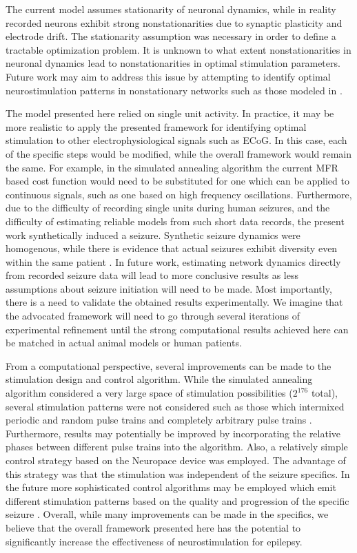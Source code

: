 \documentclass[11pt,a4paper,final]{article}
\begin{document}
The current model assumes stationarity of neuronal dynamics, while in reality recorded neurons exhibit strong nonstationarities due to synaptic plasticity and electrode drift. 
The stationarity assumption was necessary in order to define a tractable optimization problem. 
It is unknown to what extent nonstationarities in neuronal dynamics lead to nonstationarities in optimal stimulation parameters. 
Future work may aim to address this issue by attempting to identify optimal neurostimulation patterns in nonstationary networks such as those modeled in \citet{robinson16}.

The model presented here relied on single unit activity.
In practice, it may be more realistic to apply the presented framework for identifying optimal stimulation to other electrophysiological signals such as ECoG.
In this case, each of the specific steps would be modified, while the overall framework would remain the same.
For example, in the simulated annealing algorithm the current MFR based cost function would need to be substituted for one which can be applied to continuous signals, such as one based on high frequency oscillations.
Furthermore, due to the difficulty of recording single units during human seizures, and the difficulty of estimating reliable models from such short data records, the present work synthetically induced a seizure.
Synthetic seizure dynamics were homogenous, while there is evidence that actual seizures exhibit diversity even within the same patient \citep{bower12,he14}. 
In future work, estimating network dynamics directly from recorded seizure data will lead to more conclusive results as less assumptions about seizure initiation will need to be made.
Most importantly, there is a need to validate the obtained results experimentally.
We imagine that the advocated framework will need to go through several iterations of experimental refinement until the strong computational results achieved here can be matched in actual animal models or human patients.

From a computational perspective, several improvements can be made to the stimulation design and control algorithm.
While the simulated annealing algorithm considered a very large space of stimulation possibilities ($2^{176}$ total), several stimulation patterns were not considered such as those which intermixed periodic and random pulse trains and completely arbitrary pulse trains \citep{grill14patent2,brocker17}.
Furthermore, results may potentially be improved by incorporating the relative phases between different pulse trains into the algorithm.
Also, a relatively simple control strategy based on the Neuropace device was employed.
The advantage of this strategy was that the stimulation was independent of the seizure specifics.
In the future more sophisticated control algorithms may be employed which emit different stimulation patterns based on the quality and progression of the specific seizure \citep{ching12,zalay13,kalitzin14,ehrens15}.
Overall, while many improvements can be made in the specifics, we believe that the overall framework presented here has the potential to significantly increase the effectiveness of neurostimulation for epilepsy.
\end{document}
